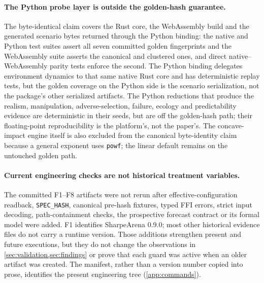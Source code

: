 \paragraph{The Python probe layer is outside the golden-hash guarantee.} The byte-identical claim covers the Rust core, the WebAssembly build and the generated scenario bytes returned through the Python binding: the native and Python test suites assert all seven committed golden fingerprints and the WebAssembly suite asserts the canonical and clustered ones, and direct native--WebAssembly parity tests enforce the second. The Python binding delegates environment dynamics to that same native Rust core and has deterministic replay tests, but the golden coverage on the Python side is the scenario serialization, not the package's other serialized artifacts. The Python reductions that produce the realism, manipulation, adverse-selection, failure, ecology and predictability evidence are deterministic in their seeds, but are off the golden-hash path; their floating-point reproducibility is the platform's, not the paper's. The concave-impact engine itself is also excluded from the canonical byte-identity claim because a general exponent uses \texttt{powf}; the linear default remains on the untouched golden path.

\paragraph{Current engineering checks are not historical treatment variables.} The committed F1--F8 artifacts were not rerun after effective-configuration readback, \texttt{SPEC\_HASH}, canonical pre-hash fixtures, typed FFI errors, strict input decoding, path-containment checks, the prospective forecast contract or its formal model were added. F1 identifies SharpeArena 0.9.0; most other historical evidence files do not carry a runtime version. Those additions strengthen present and future executions, but they do not change the observations in \cref{sec:validation,sec:findings} or prove that each guard was active when an older artifact was created. The manifest, rather than a version number copied into prose, identifies the present engineering tree (\cref{app:commands}).

